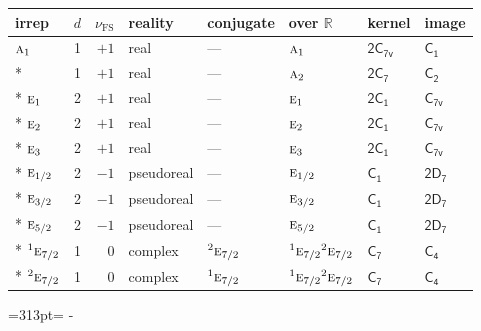 \documentclass[10pt,a4paper]{article}
\makeatletter
\def\grouprule#1#2{\noalign{\marks\LTgroupmarks{\the\belowrulesep}\nobreak\vskip#1%
  \vskip\aboverulesep}\multispan\LT@cols\unskip{\leaders\hrule\@height#2\hfill\kern\z@}\cr
  \noalign{\penalty\LTrulebreak\vskip\belowrulesep\global\@lastruleclass\z@}}
\newcommand{\needspace}[1]{\par\penalty-100\begingroup\dimen0=#1\relax\dimen2=\pagegoal
  \advance\dimen2-\pagetotal\ifdim\dimen0>\dimen2\relax\ifdim\dimen2>0pt\vfil\break\fi\fi
  \endgroup}
\numberwithin{equation}{section}
\newcommand{\grp}[1]{\mathsf{#1}}
\newcommand{\irr}[1]{\text{\normalfont\scshape #1}}
\newcommand{\conjpair}[1]{{}^{#1}}
\newcommand{\detbox}[1]{{\setlength{\fboxsep}{1pt}\fbox{#1}}}
\newcommand{\fsind}{\nu_{\mathrm{FS}}}
\makeatother
\begin{document}
\setlength{\emergencystretch}{2em}\par\setlength{\emergencystretch}{0pt}
{\small\renewcommand{\arraystretch}{1.25}\setlength{\tabcolsep}{4pt}\begin{longtable}{@{}lrrlllll@{}}\toprule
irrep & $d$ & $\fsind$ & reality & conjugate & over $\mathbb{R}$ & kernel & image\\\midrule\endhead
\bottomrule\endfoot\endlastfoot
$\irr{a}_{1}$ & 1 & $+1$ & real & --- & $\irr{a}_{1}$ & \href{2C7v.pdf}{$\grp{2C_{7v}}$} & \href{../../../rotation/data/pdf/C1.pdf}{$\grp{C_{1}}$}\\*
\detbox{$\irr{a}_{2}$} & 1 & $+1$ & real & --- & $\irr{a}_{2}$ & \href{2C7.pdf}{$\grp{2C_{7}}$} & \href{../../../rotation/data/pdf/C2.pdf}{$\grp{C_{2}}$}\\*
$\irr{e}_{1}$ & 2 & $+1$ & real & --- & $\irr{e}_{1}$ & \href{2C1.pdf}{$\grp{2C_{1}}$} & \href{../../../rotation/data/pdf/C7v.pdf}{$\grp{C_{7v}}$}\\*
$\irr{e}_{2}$ & 2 & $+1$ & real & --- & $\irr{e}_{2}$ & \href{2C1.pdf}{$\grp{2C_{1}}$} & \href{../../../rotation/data/pdf/C7v.pdf}{$\grp{C_{7v}}$}\\*
$\irr{e}_{3}$ & 2 & $+1$ & real & --- & $\irr{e}_{3}$ & \href{2C1.pdf}{$\grp{2C_{1}}$} & \href{../../../rotation/data/pdf/C7v.pdf}{$\grp{C_{7v}}$}\\*
\grouprule{0pt}{\lightrulewidth}
$\irr{e}_{1/2}$ & 2 & $-1$ & pseudoreal & --- & $\irr{e}_{1/2}$ & \href{C1.pdf}{$\grp{C_{1}}$} & \href{2D7.pdf}{$\grp{2D_{7}}$}\\*
$\irr{e}_{3/2}$ & 2 & $-1$ & pseudoreal & --- & $\irr{e}_{3/2}$ & \href{C1.pdf}{$\grp{C_{1}}$} & \href{2D7.pdf}{$\grp{2D_{7}}$}\\*
$\irr{e}_{5/2}$ & 2 & $-1$ & pseudoreal & --- & $\irr{e}_{5/2}$ & \href{C1.pdf}{$\grp{C_{1}}$} & \href{2D7.pdf}{$\grp{2D_{7}}$}\\*
$\conjpair{1}\irr{e}_{7/2}$ & 1 & $0$ & complex & $\conjpair{2}\irr{e}_{7/2}$ & $\conjpair{1}\irr{e}_{7/2}\conjpair{2}\irr{e}_{7/2}$ & \href{C7.pdf}{$\grp{C_{7}}$} & \href{../../../rotation/data/pdf/C4.pdf}{$\grp{C_{4}}$}\\*
$\conjpair{2}\irr{e}_{7/2}$ & 1 & $0$ & complex & $\conjpair{1}\irr{e}_{7/2}$ & $\conjpair{1}\irr{e}_{7/2}\conjpair{2}\irr{e}_{7/2}$ & \href{C7.pdf}{$\grp{C_{7}}$} & \href{../../../rotation/data/pdf/C4.pdf}{$\grp{C_{4}}$}\\
\bottomrule\end{longtable}}
\needspace{313pt}
\end{document}
